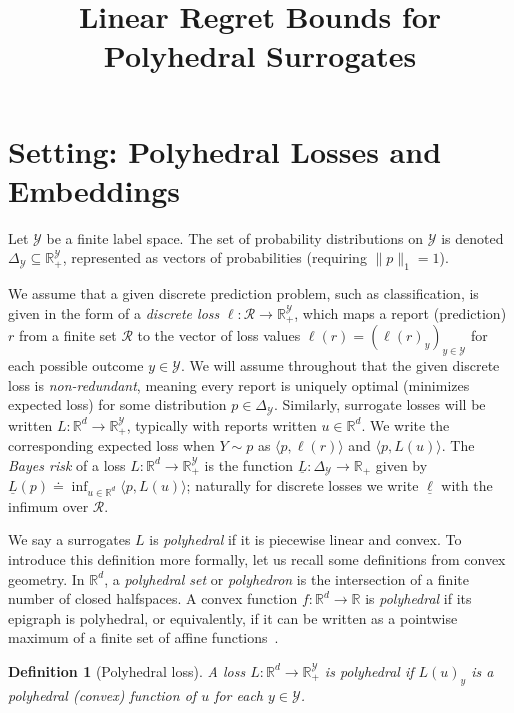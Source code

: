 \documentclass[12pt]{article}
\title{Linear Regret Bounds for Polyhedral Surrogates}
\newcommand{\reals}{\mathbb{R}}
\newcommand{\defeq}{\doteq}%
\newcommand{\simplex}{\Delta_\Y}
\newcommand{\R}{\mathcal{R}}
\newcommand{\Y}{\mathcal{Y}}
\newcommand{\risk}[1]{\underline{#1}}
\newcommand{\inprod}[2]{\langle #1, #2 \rangle}%
\newtheorem{definition}{Definition}
\begin{document}
\maketitle


\section{Setting: Polyhedral Losses and Embeddings}

Let $\Y$ be a finite label space.
The set of probability distributions on $\Y$ is denoted $\simplex\subseteq\reals^{\Y}_+$, represented as vectors of probabilities (requiring $\|p\|_1 = 1$).

We assume that a given discrete prediction problem, such as classification, is given in the form of a \emph{discrete loss} $\ell:\R\to\reals^\Y_+$, which maps a report (prediction) $r$ from a finite set $\R$ to the vector of loss values $\ell(r) = (\ell(r)_y)_{y\in\Y}$ for each possible outcome $y\in\Y$.
We will assume throughout that the given discrete loss is \emph{non-redundant}, meaning every report is uniquely optimal (minimizes expected loss) for some distribution $p\in\simplex$.
Similarly, surrogate losses will be written $L:\reals^d\to\reals^\Y_+$, typically with reports written $u\in\reals^d$.
We write the corresponding expected loss when $Y \sim p$ as $\inprod{p}{\ell(r)}$ and $\inprod{p}{L(u)}$.
The \emph{Bayes risk} of a loss $L:\reals^d\to\reals^\Y_+$ is the function $\risk{L}:\simplex\to\reals_+$ given by $\risk{L}(p) \defeq \inf_{u\in\reals^d} \inprod{p}{L(u)}$; naturally for discrete losses we write $\risk{\ell}$ with the infimum over $\R$.

We say a surrogates $L$ is \emph{polyhedral} if it is piecewise linear and convex.
To introduce this definition more formally, let us recall some definitions from convex geometry.
In $\reals^d$, a \emph{polyhedral set} or \emph{polyhedron} is the intersection of a finite number of closed halfspaces.
A convex function $f:\reals^d\to\reals$ is \emph{polyhedral} if its epigraph is polyhedral, or equivalently, if it can be written as a pointwise maximum of a finite set of affine functions~\cite{rockafellar1997convex}.

\begin{definition}[Polyhedral loss]
  A loss $L: \reals^d \to \reals^{\Y}_+$ is \emph{polyhedral} if $L(u)_y$ is a polyhedral (convex) function of $u$ for each $y\in\Y$.
\end{definition}
\end{document}
